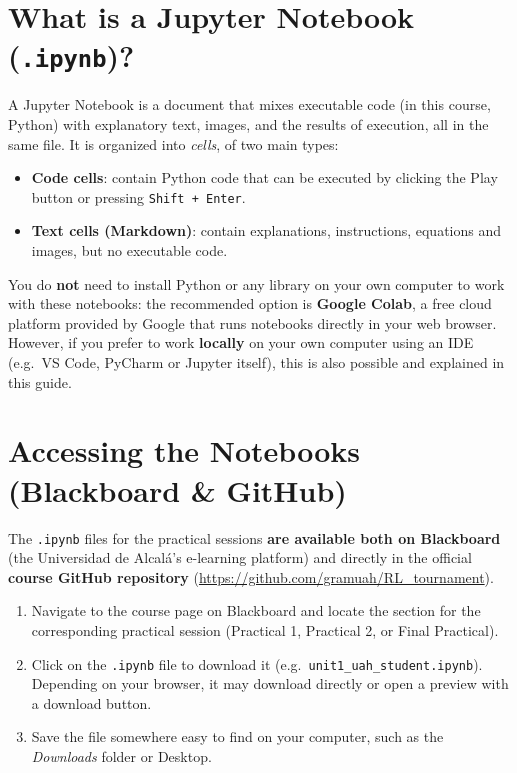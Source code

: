 \documentclass[11pt,a4paper]{article}
\begin{document}
\section{What is a Jupyter Notebook (\texttt{.ipynb})?}

A Jupyter Notebook is a document that mixes executable code (in this course, Python) with explanatory text, images, and the results of execution, all in the same file. It is organized into \textit{cells}, of two main types:

\begin{itemize}
    \item \textbf{Code cells}: contain Python code that can be executed by clicking the Play button or pressing \texttt{Shift + Enter}.
    \item \textbf{Text cells (Markdown)}: contain explanations, instructions, equations and images, but no executable code.
\end{itemize}

You do \textbf{not} need to install Python or any library on your own computer to work with these notebooks: the recommended option is \textbf{Google Colab}, a free cloud platform provided by Google that runs notebooks directly in your web browser. However, if you prefer to work \textbf{locally} on your own computer using an IDE (e.g.\ VS Code, PyCharm or Jupyter itself), this is also possible and explained in this guide.

\section{Accessing the Notebooks (Blackboard \& GitHub)}

The \texttt{.ipynb} files for the practical sessions \textbf{are available both on Blackboard} (the Universidad de Alcal\'a's e-learning platform) and directly in the official \textbf{course GitHub repository} (\url{https://github.com/gramuah/RL_tournament}).

\begin{infobox}
\begin{enumerate}
    \item Navigate to the course page on Blackboard and locate the section for the corresponding practical session (Practical 1, Practical 2, or Final Practical).
    \item Click on the \texttt{.ipynb} file to download it (e.g.\ \texttt{unit1\_uah\_student.ipynb}). Depending on your browser, it may download directly or open a preview with a download button.
    \item Save the file somewhere easy to find on your computer, such as the \textit{Downloads} folder or Desktop.
\end{enumerate}
\end{infobox}
\end{document}
